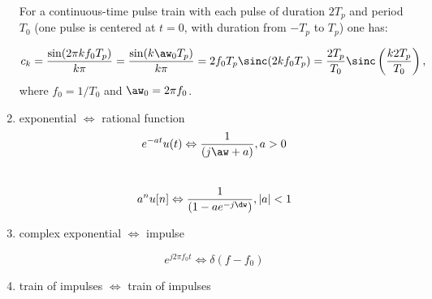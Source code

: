 \begin{enumerate}
For a continuous-time pulse train with each pulse of duration $2T_p$ and period $T_0$ (one pulse is centered at $t=0$, with duration from $-T_p$ to $T_p$) one has:
\[
c_k = \frac{\sin(2 \pi k f_0 T_p) }{k \pi} =\frac{\sin(k \aw_0 T_p) }{k  \pi} = 2 f_0 T_p \sinc(2 k f_0 T_p) = \frac{2 T_p}{T_0} \sinc \left( \frac{k 2 T_p}{T_0}  \right),
\]
where $f_0=1/T_0$ and $\aw_0 = 2 \pi f_0$.

\item exponential $\Leftrightarrow$ rational function
\[
e^{-at} u(t) \Leftrightarrow \frac{1}{(j\aw + a)}, a > 0
\]
~\newline
\[
a^n u[n] \Leftrightarrow \frac{1}{{(1 - ae^{ - j\dw } )}},\left| a \right| < 1
\]

\item complex exponential $\Leftrightarrow$ impulse

\begin{equation}
e^{j 2 \pi f_0 t} \Leftrightarrow \delta (f - f_0)
\label{eq:exponentialImpulseFourierPair}
\end{equation}


\item train of impulses $\Leftrightarrow$ train of impulses


\end{enumerate}
